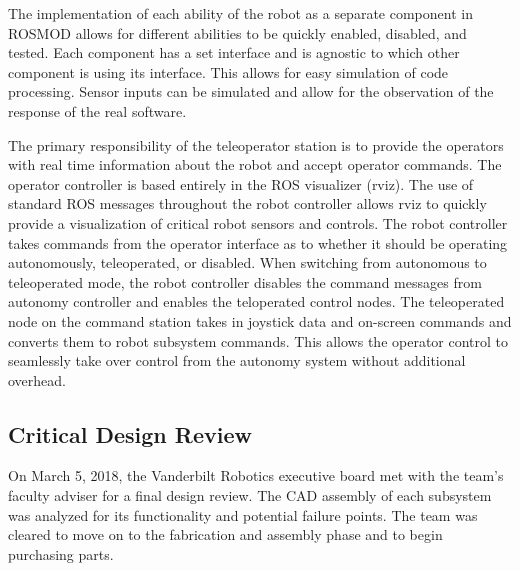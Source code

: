 \documentclass[class=article, crop=false]{standalone}
\begin{document}
	The implementation of each ability of the robot as a separate component in ROSMOD allows for different abilities to be quickly enabled, disabled, and tested. Each component has a set interface and is agnostic to which other component is using its interface. This allows for easy simulation of code processing. Sensor inputs can be simulated and allow for the observation of the response of the real software.

	
	
	The primary responsibility of the teleoperator station is to provide the operators with real time information about the robot and accept operator commands. The operator controller is based entirely in the ROS visualizer (rviz). The use of standard ROS messages throughout the robot controller allows rviz to quickly provide a visualization of critical robot sensors and controls. The robot controller takes commands from the operator interface as to whether it should be operating autonomously, teleoperated, or disabled. When switching from autonomous to teleoperated mode, the robot controller disables the command messages from autonomy controller and enables the teloperated control nodes. The teleoperated node on the command station takes in joystick data and on-screen commands and converts them to robot subsystem commands. This allows the operator control to seamlessly take over control from the autonomy system without additional overhead.
	
	
	
	\subsection{Critical Design Review}
	
	On March 5, 2018, the Vanderbilt Robotics executive board met with the team’s faculty adviser for a final design review. The CAD assembly of each subsystem was analyzed for its functionality and potential failure points. The team was cleared to move on to the fabrication and assembly phase and to begin purchasing parts. 
	
	
	


	
\end{document}
